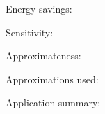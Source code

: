 \documentclass{article}
\begin{document}
    
Energy savings:



Sensitivity:







\vspace{2em}
Approximateness:





\vspace{2em}
Approximations used:



Application summary:


\end{document}
